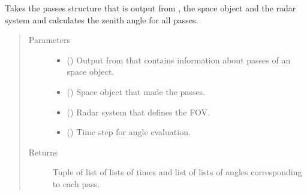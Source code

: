 \documentclass[letterpaper,10pt,english]{sphinxmanual}
\begin{document}
\begin{fulllineitems}
\label{\detokenize{modules/simulate_tracking:simulate_tracking.get_angles}}
Takes the passes structure that is output from {\hyperref[\detokenize{modules/simulate_tracking:simulate_tracking.get_passes}]{}}, the space object and the radar system and calculates the zenith angle for all passes.
\begin{quote}\begin{description}
\item[{Parameters}] \leavevmode\begin{itemize}
\item {} 
 () \textendash{} Output from {\hyperref[\detokenize{modules/simulate_tracking:simulate_tracking.get_passes}]{}} that contains information about passes of an space object.

\item {} 
 ({\hyperref[\detokenize{modules/space_object:space_object.SpaceObject}]{}}) \textendash{} Space object that made the passes.

\item {} 
 ({\hyperref[\detokenize{modules/radar_config:radar_config.RadarSystem}]{}}) \textendash{} Radar system that defines the FOV.

\item {} 
 () \textendash{} Time step for angle evaluation.

\end{itemize}

\item[{Returns}] \leavevmode
Tuple of list of lists of times and list of lists of angles corresponding to each pass.

\end{description}\end{quote}

\end{fulllineitems}
\end{document}
